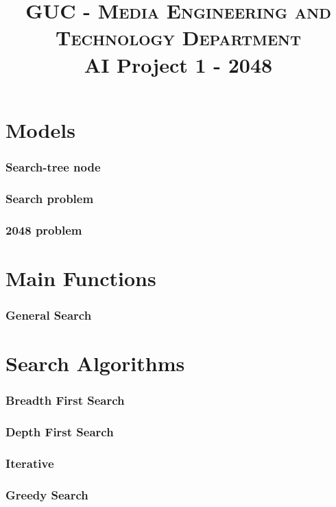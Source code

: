 \documentclass[14pt,a4paper]{report}
\begin{document}
\title{
    \textsc{GUC - Media Engineering and Technology Department} \\
    AI Project 1 - 2048
}


\renewcommand{\abstractname}{Brief}
\begin{abstract}
\end{abstract}

\tableofcontents

\part{Models}

\section{Search-tree node}

\section{Search problem}

\section{2048 problem}

\part{Main Functions}
\section{General Search}

\part{Search Algorithms}
\section{Breadth First Search}
\section{Depth First Search}
\section{Iterative }
\section{Greedy Search}
\end{document}
